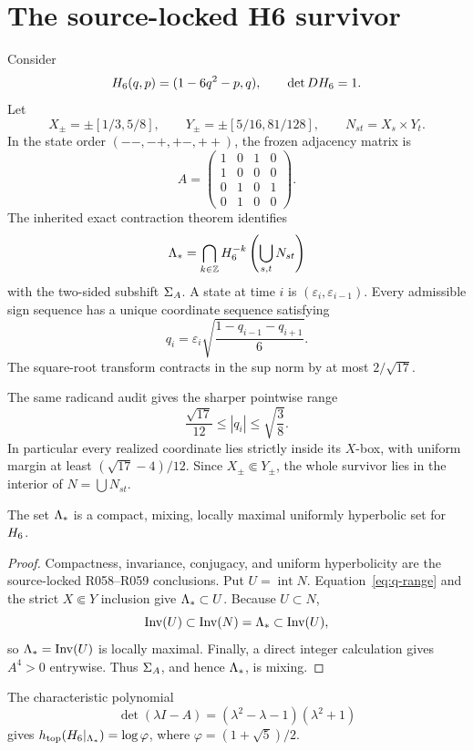 \section{The source-locked H6 survivor}
\label{sec:survivor}

Consider
\[
  H_6(q,p)=(1-6q^2-p,q),
  \qquad \det DH_6=1.
\]
Let
\[
  X_\pm=\pm[1/3,5/8],
  \qquad Y_\pm=\pm[5/16,81/128],
  \qquad N_{st}=X_s\times Y_t.
\]
In the state order \((--,-+,+-,++)\), the frozen adjacency matrix is
\[
 A=\begin{pmatrix}
 1&0&1&0\\
 1&0&0&0\\
 0&1&0&1\\
 0&1&0&0
 \end{pmatrix}.
\]
The inherited exact contraction theorem identifies
\[
 \Lambda_*=\bigcap_{k\in\mathbb Z}H_6^{-k}
      \left(\bigcup_{s,t}N_{st}\right)
\]
with the two-sided subshift \(\Sigma_A\).  A state at time \(i\) is
\((\varepsilon_i,\varepsilon_{i-1})\).  Every admissible sign sequence has a
unique coordinate sequence satisfying
\[
 q_i=\varepsilon_i
 \sqrt{\frac{1-q_{i-1}-q_{i+1}}6}.
 \tag{3.1}\label{eq:recurrence}
\]
The square-root transform contracts in the sup norm by at most
\(2/\sqrt{17}\).

The same radicand audit gives the sharper pointwise range
\[
  \frac{\sqrt{17}}{12}\le |q_i|\le \sqrt{\frac38}.
  \tag{3.2}\label{eq:q-range}
\]
In particular every realized coordinate lies strictly inside its \(X\)-box,
with uniform margin at least \((\sqrt{17}-4)/12\).  Since
\(X_\pm\Subset Y_\pm\), the whole survivor lies in the interior of
\(N=\bigcup N_{st}\).

\begin{proposition}
\label{prop:basic}
The set \(\Lambda_*\) is a compact, mixing, locally maximal uniformly hyperbolic
set for \(H_6\).
\end{proposition}

\begin{proof}
Compactness, invariance, conjugacy, and uniform hyperbolicity are the
source-locked R058--R059 conclusions.  Put \(U=\operatorname{int}N\).
Equation~\eqref{eq:q-range} and the strict \(X\Subset Y\) inclusion give
\(\Lambda_*\subset U\).  Because \(U\subset N\),
\[
 \operatorname{Inv}(U)\subset\operatorname{Inv}(N)=\Lambda_*\subset\operatorname{Inv}(U),
\]
so \(\Lambda_*=\operatorname{Inv}(U)\) is locally maximal.  Finally, a direct integer
calculation gives \(A^4>0\) entrywise.  Thus \(\Sigma_A\), and hence \(\Lambda_*\),
is mixing.
\end{proof}

The characteristic polynomial
\[
 \det(\lambda I-A)
 =(\lambda^2-\lambda-1)(\lambda^2+1)
\]
gives \(h_{\mathrm{top}}(H_6|_{\Lambda_*})=\log\varphi\), where
\(\varphi=(1+\sqrt5)/2\).
